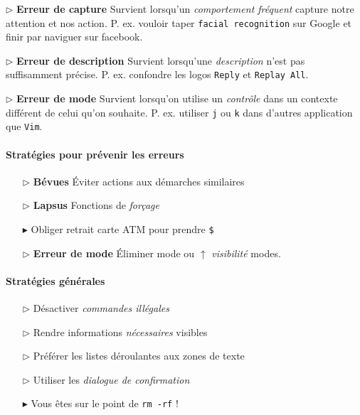 \documentclass{report}
\begin{document}
\begin{multicols*}{3}

    \noindent $\rhd$ \textbf{Erreur de capture} Survient 
    lorsqu'un \textit{comportement fréquent} capture notre attention et 
    nos action. P. ex. vouloir taper \texttt{facial recognition} sur 
    Google et finir par naviguer sur facebook. 


    \noindent $\rhd$ \textbf{Erreur de description} Survient 
    lorsqu'une \textit{description} n'est pas suffisamment précise. 
    P. ex. confondre les logos \texttt{Reply} et \texttt{Replay All}.    


    \noindent $\rhd$ \textbf{Erreur de mode} Survient 
    lorsqu'on utilise un \textit{contrôle} dans un contexte 
    différent de celui qu'on souhaite. P. ex. utiliser 
    \texttt{j} ou \texttt{k} dans d'autres application que \texttt{Vim}.
    \columnbreak


    \paragraph{Stratégies pour prévenir les erreurs}
    \begin{itemize}
      \item [$\rhd$ ] \textbf{Bévues }  Éviter actions aux démarches similaires
      \item [$\rhd$ ] \textbf{Lapsus} Fonctions de \textit{forçage}   
      \item [$\blacktriangleright$ ]  Obliger retrait carte ATM 
        pour prendre \texttt{\$}  
      \item [$\rhd$ ] \textbf{Erreur de mode} Éliminer mode 
        ou $\uparrow$ \textit{visibilité} modes.   
    \end{itemize}

    \paragraph{Stratégies générales}
    \begin{itemize}
      \item [$\rhd$ ] Désactiver \textit{commandes illégales}  
      \item [$\rhd$ ] Rendre informations \textit{nécessaires} visibles  
      \item [$\rhd$ ] Préférer les listes déroulantes aux zones de texte 
      \item [$\rhd$ ] Utiliser les \textit{dialogue de confirmation}  
      \item [$\blacktriangleright$ ] Vous êtes sur le point de \texttt{rm -rf} !    
    \end{itemize}


\end{multicols*}
\end{document}
